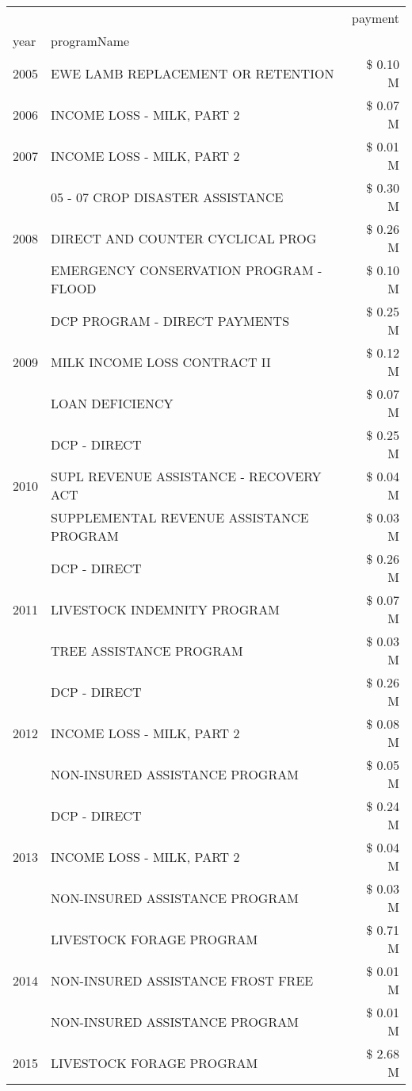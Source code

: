 \begin{tabular}{llr}
\toprule
 &  & payment \\
year & programName &  \\
\midrule
2005 & EWE LAMB REPLACEMENT OR RETENTION & \$ 0.10 M \\
\cline{1-3}
2006 & INCOME LOSS - MILK, PART 2 & \$ 0.07 M \\
\cline{1-3}
2007 & INCOME LOSS - MILK, PART 2 & \$ 0.01 M \\
\cline{1-3}
\multirow[t]{3}{*}{2008} & 05 - 07 CROP DISASTER ASSISTANCE & \$ 0.30 M \\
 & DIRECT AND COUNTER CYCLICAL PROG & \$ 0.26 M \\
 & EMERGENCY CONSERVATION PROGRAM - FLOOD & \$ 0.10 M \\
\cline{1-3}
\multirow[t]{3}{*}{2009} & DCP PROGRAM - DIRECT PAYMENTS & \$ 0.25 M \\
 & MILK INCOME LOSS CONTRACT II & \$ 0.12 M \\
 & LOAN DEFICIENCY & \$ 0.07 M \\
\cline{1-3}
\multirow[t]{3}{*}{2010} & DCP - DIRECT & \$ 0.25 M \\
 & SUPL REVENUE ASSISTANCE - RECOVERY ACT & \$ 0.04 M \\
 & SUPPLEMENTAL REVENUE ASSISTANCE PROGRAM & \$ 0.03 M \\
\cline{1-3}
\multirow[t]{3}{*}{2011} & DCP - DIRECT & \$ 0.26 M \\
 & LIVESTOCK INDEMNITY PROGRAM & \$ 0.07 M \\
 & TREE ASSISTANCE PROGRAM & \$ 0.03 M \\
\cline{1-3}
\multirow[t]{3}{*}{2012} & DCP - DIRECT & \$ 0.26 M \\
 & INCOME LOSS - MILK, PART 2 & \$ 0.08 M \\
 & NON-INSURED ASSISTANCE PROGRAM & \$ 0.05 M \\
\cline{1-3}
\multirow[t]{3}{*}{2013} & DCP - DIRECT & \$ 0.24 M \\
 & INCOME LOSS - MILK, PART 2 & \$ 0.04 M \\
 & NON-INSURED ASSISTANCE PROGRAM & \$ 0.03 M \\
\cline{1-3}
\multirow[t]{3}{*}{2014} & LIVESTOCK FORAGE PROGRAM & \$ 0.71 M \\
 & NON-INSURED ASSISTANCE FROST FREE & \$ 0.01 M \\
 & NON-INSURED ASSISTANCE PROGRAM & \$ 0.01 M \\
\cline{1-3}
\multirow[t]{3}{*}{2015} & LIVESTOCK FORAGE PROGRAM & \$ 2.68 M \\

\end{tabular}

